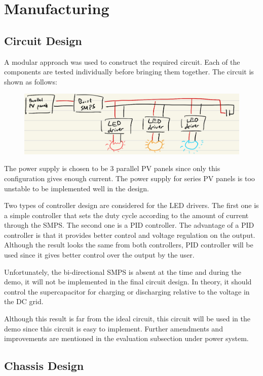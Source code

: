 \section{Manufacturing}
\subsection{Circuit Design}
A modular approach was used to construct the required circuit. Each of the components are tested individually before bringing them together. The circuit is shown as follows:

\begin{figure}
    \centering
    \includegraphics[width=0.8\linewidth]{images/circuit-design.png}
    \caption{}
\end{figure}

The power supply is chosen to be 3 parallel PV panels since only this configuration gives enough current. The power supply for series PV panels is too unstable to be implemented well in the design.

Two types of controller design are considered for the LED drivers. The first one is a simple controller that sets the duty cycle according to the amount of current through the SMPS. The second one is a PID controller. The advantage of a PID controller is that it provides better control and voltage regulation on the output. Although the result looks the same from both controllers, PID controller will be used since it gives better control over the output by the user.

Unfortunately, the bi-directional SMPS is absent at the time and during the demo, it will not be implemented in the final circuit design. In theory, it should control the supercapacitor for charging or discharging relative to the voltage in the DC grid.

Although this result is far from the ideal circuit, this circuit will be used in the demo since this circuit is easy to implement. Further amendments and improvements are mentioned in the evaluation subsection under power system.


\newpage

\subsection{Chassis Design}

